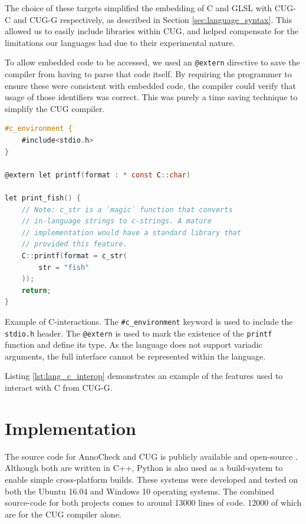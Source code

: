 \documentclass[a4paper,12pt,twoside,openright]{report}
\def\totalloccount{13000 }
\def\compilerloccount{12000 }
\begin{document}
The choice of these targets simplified the embedding of C and GLSL with CUG-C
and CUG-G respectively, as described in Section \ref{sec:language_syntax}. This
allowed us to easily include libraries within CUG, and helped compensate for
the limitations our languages had due to their experimental nature.

To allow embedded code to be accessed, we used an \texttt{@extern} directive to
save the compiler from having to parse that code itself. By requiring the
programmer to ensure these were consistent with embedded code, the compiler
could verify that usage of those identifiers was correct. This was purely a
time saving technique to simplify the CUG compiler.


\begin{lstfloat}
\begin{lstlisting}[language=C]
#c_environment {
    #include<stdio.h>
}

@extern let printf(format : * const C::char)

let print_fish() {
    // Note: c_str is a `magic` function that converts
    // in-language strings to c-strings. A mature
    // implementation would have a standard library that
    // provided this feature.
    C::printf(format = c_str(
        str = "fish"
    ));
    return;
}
\end{lstlisting}
\caption{Example of C-interactions. The \texttt{\#c\_environment} keyword is
used to include the \texttt{stdio.h} header. The \texttt{@extern} is used to
mark the existence of the \texttt{printf} function and define its type. As the
language does not support variadic arguments, the full interface cannot be
represented within the language.}
\label{lst:lang_c_interop}
\end{lstfloat}

Listing \ref{lst:lang_c_interop} demonstrates an example of the features used
to interact with C from CUG-G.

\chapter{Implementation}

\label{chp:implementation}

The source code for AnnoCheck and CUG is publicly available and open-source
\cite{ProjectSource}. Although both are written in C++, Python is also used as
a build-system to enable simple cross-platform builds. These systems were
developed and tested on both the Ubuntu 16.04 and Windows 10 operating systems.
The combined source-code for both projects comes to around \totalloccount lines
of code. \compilerloccount of which are for the CUG compiler alone.
\end{document}
